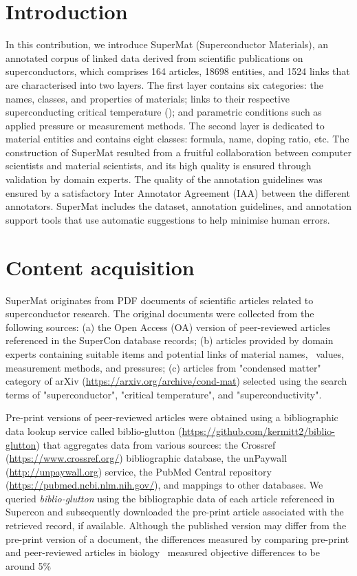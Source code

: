 \section{Introduction}

In this contribution, we introduce SuperMat (Superconductor Materials), an annotated corpus of linked data derived from scientific publications on superconductors, which comprises 164 articles, 18698 entities, and 1524 links that are characterised into two layers. The first layer contains six categories: the names, classes, and properties of materials; links to their respective superconducting critical temperature (\tc); and parametric conditions such as applied pressure or measurement methods.
The second layer is dedicated to material entities and contains eight classes: formula, name, doping ratio, etc. 
The construction of SuperMat resulted from a fruitful collaboration between computer scientists and material scientists, and its high quality is ensured through validation by domain experts. 
The quality of the annotation guidelines was ensured by a satisfactory Inter Annotator Agreement (IAA) between the different annotators. 
SuperMat includes the dataset, annotation guidelines, and annotation support tools that use automatic suggestions to help minimise human errors.

\label{content-acquisition}
\section{Content acquisition}
SuperMat originates from PDF documents of scientific articles related to superconductor research. 
The original documents were collected from the following sources: (a) the Open Access (OA) version of peer-reviewed articles referenced in the SuperCon database records; 
(b) articles provided by domain experts containing suitable items and potential links of material names, \tc~values, measurement methods, and pressures; (c) articles from "condensed matter" category of arXiv (\url{https://arxiv.org/archive/cond-mat}) selected using the search terms of "superconductor", "critical temperature", and "superconductivity". 

Pre-print versions of peer-reviewed articles were obtained using a bibliographic data lookup service called biblio-glutton (\url{https://github.com/kermitt2/biblio-glutton}) that aggregates data from various sources: the Crossref (\url{https://www.crossref.org/}) bibliographic database, the unPaywall (\url{http://unpaywall.org}) service, the PubMed Central repository (\url{https://pubmed.ncbi.nlm.nih.gov/}), and mappings to other databases. 
We queried \textit{biblio-glutton} using the bibliographic data of each article referenced in Supercon and subsequently downloaded the pre-print article associated with the retrieved record, if available. 
Although the published version may differ from the pre-print version of a document, the differences measured by comparing pre-print and peer-reviewed articles in biology~\cite{carneiro_comparing_2020} measured objective differences to be around 5\% %


